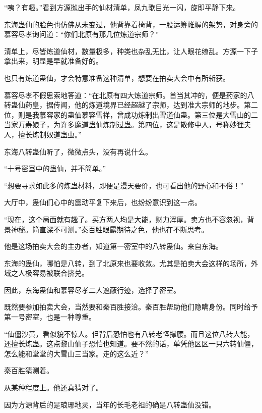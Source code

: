
\begin{this_body}



“咦？有趣。”看到方源抛出手的仙材清单，凤九歌目光一闪，旋即平静下来。

东海蛊仙的脸色也仿佛从未变过，他背靠着椅背，一股运筹帷幄的架势，对身旁的慕容尽孝询问道：“你们北原有那几位炼道宗师？”

清单上，尽皆炼道仙材，数量极多，种类也杂乱无比，让人眼花缭乱。方源一下子拿出来，明显是早就准备好的。

也只有炼道蛊仙，才会特意准备这种清单，想要在拍卖大会中有所斩获。

慕容尽孝不假思索地答道：“在北原有四大炼道宗师。首当其冲的，便是药家的八转蛊仙药皇，据传闻，他的炼道境界已经超越了宗师，达到准大宗师的地步。第二位，则是我慕容家的蛊仙慕容雪祥，曾成功炼制出雪道仙蛊。第三位是大雪山的二当家万寿娘子，为许多魔道蛊仙炼制过蛊。第四位，这是散修中人，号称妙狸夫人，擅长炼制奴道蛊虫。”

东海八转蛊仙听了，微微点头，没有再说什么。

“十号密室中的蛊仙，并不简单。”

“想要寻求如此多的炼蛊材料，即便是漫天要价，也可看出他的野心和不俗！”

大厅中，蛊仙们心中的震动平复下来后，也纷纷意识到这一点。

“现在，这个局面就有趣了。买方两人均是大能，财力浑厚。卖方也不容忽视，背景神秘。简直深不可测。”秦百胜眼露期待之色，他也在不断思考。

他是这场拍卖大会的主办者，知道第一密室中的八转蛊仙。来自东海。

东海的蛊仙，哪怕是八转，到了北原来也要收敛。尤其是拍卖大会这样的场所，外域之人极容易被联合挤兑。

因此，东海蛊仙和慕容尽孝二人遮蔽行迹，选择了密室。

既然要参加拍卖大会，当然要和秦百胜接洽。秦百胜帮助他们隐瞒身份。同时给予第一号密室，也是一种尊重。

“仙僵沙黄，看似貌不惊人。但背后恐怕也有八转老怪撑腰。而且这位八转大能，还擅长炼蛊。这点黎山仙子恐怕也知道。要不然的话，单凭他区区一只六转仙僵，怎么能和堂堂的大雪山三当家。走的这么近？”

秦百胜猜测着。

从某种程度上。他还真猜对了。

因为方源背后的是琅琊地灵，当年的长毛老祖的确是八转蛊仙没错。


\end{this_body}

